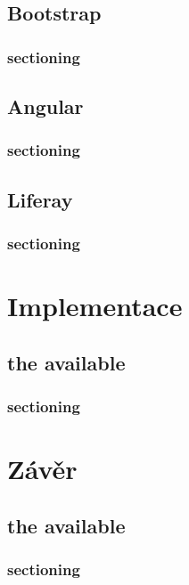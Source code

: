 \documentclass[
  digital, %
  oneside, %
  table,   %
  nolof,     %
  nolot,     %
]{fithesis3}
\begin{document}
\section{Bootstrap}
\subsection{sectioning}
\section{Angular}
\subsection{sectioning}
\section{Liferay}
\subsection{sectioning}

\chapter{Implementace}
\section{the available}
\subsection{sectioning}

\chapter{Závěr}
\section{the available}
\subsection{sectioning}
\printbibliography
\end{document}
